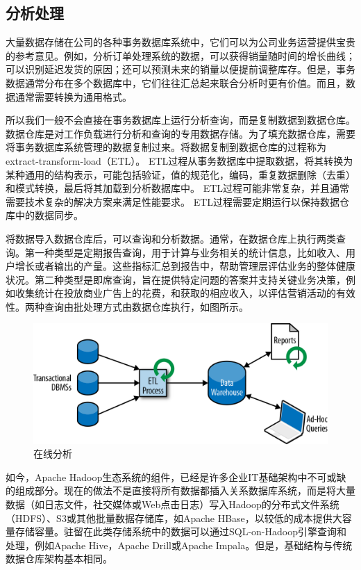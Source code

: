 \documentclass[cn,11pt,chinese]{elegantbook}
\begin{document}
\hypertarget{ux5206ux6790ux5904ux7406}{%
\subsection{分析处理}\label{ux5206ux6790ux5904ux7406}}

大量数据存储在公司的各种事务数据库系统中，它们可以为公司业务运营提供宝贵的参考意见。例如，分析订单处理系统的数据，可以获得销量随时间的增长曲线；可以识别延迟发货的原因；还可以预测未来的销量以便提前调整库存。但是，事务数据通常分布在多个数据库中，它们往往汇总起来联合分析时更有价值。而且，数据通常需要转换为通用格式。

所以我们一般不会直接在事务数据库上运行分析查询，而是复制数据到数据仓库。数据仓库是对工作负载进行分析和查询的专用数据存储。为了填充数据仓库，需要将事务数据库系统管理的数据复制过来。将数据复制到数据仓库的过程称为extract-transform-load（ETL）。
ETL过程从事务数据库中提取数据，将其转换为某种通用的结构表示，可能包括验证，值的规范化，编码，重复数据删除（去重）和模式转换，最后将其加载到分析数据库中。
ETL过程可能非常复杂，并且通常需要技术复杂的解决方案来满足性能要求。
ETL过程需要定期运行以保持数据仓库中的数据同步。

将数据导入数据仓库后，可以查询和分析数据。通常，在数据仓库上执行两类查询。第一种类型是定期报告查询，用于计算与业务相关的统计信息，比如收入、用户增长或者输出的产量。这些指标汇总到报告中，帮助管理层评估业务的整体健康状况。第二种类型是即席查询，旨在提供特定问题的答案并支持关键业务决策，例如收集统计在投放商业广告上的花费，和获取的相应收入，以评估营销活动的有效性。两种查询由批处理方式由数据仓库执行，如图所示。

\begin{figure}
\centering
\includegraphics{images/spaf_0103.png}
\caption{在线分析}
\end{figure}

如今，Apache
Hadoop生态系统的组件，已经是许多企业IT基础架构中不可或缺的组成部分。现在的做法不是直接将所有数据都插入关系数据库系统，而是将大量数据（如日志文件，社交媒体或Web点击日志）写入Hadoop的分布式文件系统（HDFS）、S3或其他批量数据存储库，如Apache
HBase，以较低的成本提供大容量存储容量。驻留在此类存储系统中的数据可以通过SQL-on-Hadoop引擎查询和处理，例如Apache
Hive，Apache Drill或Apache
Impala。但是，基础结构与传统数据仓库架构基本相同。
\end{document}
